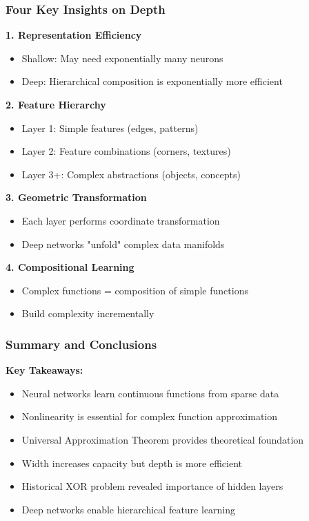 \documentclass[notes]{beamer}
\begin{document}
\begin{frame}
\begin{frame}
\frametitle{Four Key Insights on Depth}

\textbf{1. Representation Efficiency}
\begin{itemize}
\item Shallow: May need exponentially many neurons
\item Deep: Hierarchical composition is exponentially more efficient
\end{itemize}

\textbf{2. Feature Hierarchy}
\begin{itemize}
\item Layer 1: Simple features (edges, patterns)
\item Layer 2: Feature combinations (corners, textures)
\item Layer 3+: Complex abstractions (objects, concepts)
\end{itemize}

\textbf{3. Geometric Transformation}
\begin{itemize}
\item Each layer performs coordinate transformation
\item Deep networks "unfold" complex data manifolds
\end{itemize}

\textbf{4. Compositional Learning}
\begin{itemize}
\item Complex functions = composition of simple functions
\item Build complexity incrementally
\end{itemize}

\end{frame}

\begin{frame}
\frametitle{Summary and Conclusions}

\textbf{Key Takeaways:}
\begin{itemize}
\item Neural networks learn continuous functions from sparse data
\item Nonlinearity is essential for complex function approximation
\item Universal Approximation Theorem provides theoretical foundation
\item Width increases capacity but depth is more efficient
\item Historical XOR problem revealed importance of hidden layers
\item Deep networks enable hierarchical feature learning
\end{itemize}


\end{frame}
\end{frame}
\end{document}
